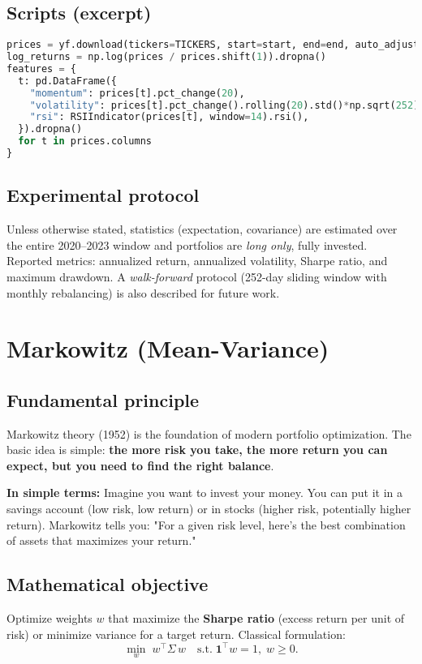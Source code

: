 \documentclass[11pt,a4paper]{article}
\begin{document}
\subsection{Scripts (excerpt)}
\begin{lstlisting}[language=Python,caption={Download and preprocessing (excerpt)}]
prices = yf.download(tickers=TICKERS, start=start, end=end, auto_adjust=True)["Close"].dropna()
log_returns = np.log(prices / prices.shift(1)).dropna()
features = {
  t: pd.DataFrame({
    "momentum": prices[t].pct_change(20),
    "volatility": prices[t].pct_change().rolling(20).std()*np.sqrt(252),
    "rsi": RSIIndicator(prices[t], window=14).rsi(),
  }).dropna()
  for t in prices.columns
}
\end{lstlisting}

\subsection{Experimental protocol}
Unless otherwise stated, statistics (expectation, covariance) are estimated over the entire 2020--2023 window and portfolios are \emph{long only}, fully invested. Reported metrics: annualized return, annualized volatility, Sharpe ratio, and maximum drawdown. A \emph{walk-forward} protocol (252-day sliding window with monthly rebalancing) is also described for future work.

\section{Markowitz (Mean-Variance)}

\subsection{Fundamental principle}
Markowitz theory (1952) is the foundation of modern portfolio optimization. The basic idea is simple: \textbf{the more risk you take, the more return you can expect, but you need to find the right balance}.

\textbf{In simple terms:} Imagine you want to invest your money. You can put it in a savings account (low risk, low return) or in stocks (higher risk, potentially higher return). Markowitz tells you: "For a given risk level, here's the best combination of assets that maximizes your return."

\subsection{Mathematical objective}
Optimize weights \(w\) that maximize the \textbf{Sharpe ratio} (excess return per unit of risk) or minimize variance for a target return. Classical formulation:
 \[\min_{w} \; w^\top \Sigma \, w \quad \text{s.t.} \; \mathbf{1}^\top w = 1,\; w \ge 0.\]
\end{document}
